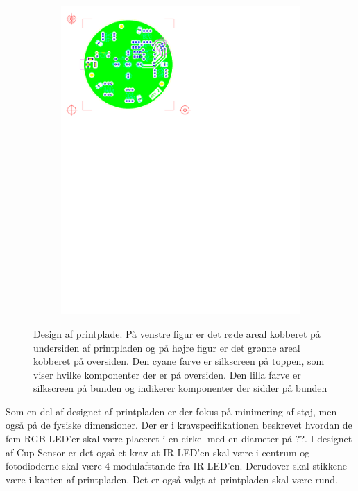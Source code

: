 \documentclass[Rapport/Rapport_main.tex]{subfiles}
\begin{document}
\begin{figure}[H]
{\begin{subfigure}{.55\textwidth}
    \includegraphics[width=1\linewidth,trim={0.6in 7.28in 4.5in 0.5in},clip, page=1]{HardwareDesign/CupHolder/graphics/top.pdf}
\end{subfigure}
}
\caption{Design af printplade. På venstre figur er det røde areal kobberet på undersiden af printpladen og på højre figur er det grønne areal kobberet på oversiden. Den cyane farve er silkscreen på toppen, som viser hvilke komponenter der er på oversiden. Den lilla farve er silkscreen på bunden og indikerer komponenter der sidder på bunden}
\label{fig:CupHolderPrintpladeDesign}
\end{figure}

Som en del af designet af printpladen er der fokus på minimering af støj, men også på de fysiske dimensioner. Der er i kravspecifikationen beskrevet hvordan de fem RGB LED'er skal være placeret i en cirkel med en diameter på ??. I designet af Cup Sensor er det også et krav at IR LED'en skal være i centrum og fotodioderne skal være 4 modulafstande fra IR LED'en. Derudover skal stikkene være i kanten af printpladen. Det er også valgt at printpladen skal være rund.
\end{document}
